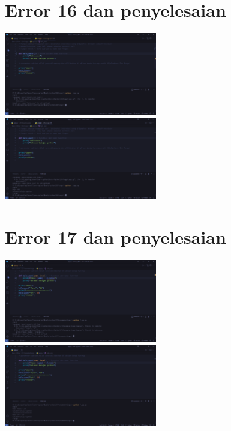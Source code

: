 \documentclass{article}
\begin{document}
\section{Error 16 dan penyelesaian}
\includegraphics[width=0.5\textwidth]{gambar/26_error.png}
\includegraphics[width=0.5\textwidth]{gambar/26_pengananan.png}

\section{Error 17 dan penyelesaian}
\includegraphics[width=0.5\textwidth]{gambar/27_error.png}
\includegraphics[width=0.5\textwidth]{gambar/27_pengananan.png}
\end{document}
